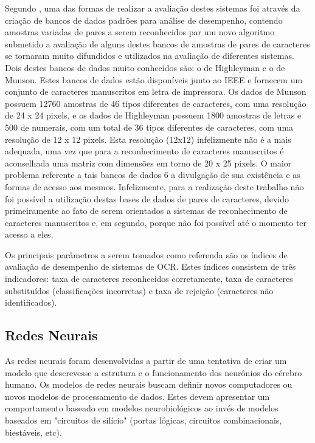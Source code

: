 			Segundo \cite{erpen2004reconhecimento}, uma das formas de realizar a avaliação destes sistemas foi através da criação de bancos de dados padrões para análise de desempenho, contendo amostras variadas de pares a serem reconhecidos par um novo algoritmo submetido a avaliação de alguns destes bancos de amostras de pares de caracteres se tornaram muito difundidos e utilizados na avaliação de diferentes sistemas. Dois destes bancos de dados muito conhecidos são: o de Highleyman e o de Munson. Estes bancos de dados estão disponíveis junto ao IEEE e fornecem um conjunto de caracteres manuscritos em letra de impressora. Os dados de Munson possuem 12760 amostras de 46 tipos diferentes de caracteres, com uma resolução de 24 x 24 pixels, e os dados de Highleyman possuem 1800 amostras de letras e 500 de numerais, com um total de 36 tipos diferentes de caracteres, com uma resolução de 12 x 12 pixels. Esta resolução (12x12) infelizmente não é a mais adequada, uma vez que para a reconhecimento de caracteres manuscritos é aconselhada uma matriz com dimensões em torno de 20 x 25 pixels. O maior problema referente a tais bancos de dados 6 a divulgação de sua existência e as formas de acesso aos mesmos. Infelizmente, para a realização deste trabalho não foi possível a utilização destas bases de dados de pares de caracteres, devido primeiramente ao fato de serem orientados a sistemas de reconhecimento de caracteres manuscritos e, em segundo, porque não foi possível até o momento ter acesso a eles.
			
			Os principais parâmetros a serem tomados como referenda são os índices de avaliação de desempenho de sistemas de OCR. Estes índices consistem de três indicadores: taxa de caracteres reconhecidos corretamente, taxa de caracteres substituídos (classificações incorretas) e taxa de rejeição (caracteres não identificados).

	\subsection{Redes Neurais}
		
		As redes neurais foram desenvolvidas a partir de uma tentativa de criar um modelo que descrevesse a estrutura e o funcionamento dos neurônios do cérebro humano. Os modelos de redes neurais buscam definir novos computadores ou novos modelos de processamento de dados. Estes devem apresentar um comportamento baseado em modelos neurobiológicos ao invés de modelos baseados em "circuitos de silício" (portas lógicas, circuitos combinacionais, biestáveis, etc).
		
